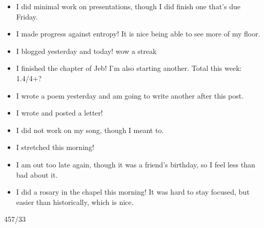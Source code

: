 \documentclass[12pt]{article}[titlepage]
\newcommand{\1}{\={a}}
\newcommand{\2}{\={e}}
\newcommand{\3}{\={\i}}
\newcommand{\4}{\=o}
\newcommand{\5}{\=u}
\newcommand{\6}{\={A}}
\renewcommand{\,}{\textsuperscript{,}}
\begin{document}
\begin{itemize}
\item I did minimal work on presentations, though I did finish one that's due Friday.
\item I made progress against entropy! It is nice being able to see more of my floor.
\item I blogged yesterday and today! wow a streak
\item I finished the chapter of Jeb! I'm also starting another. Total this week: 1.4/4+?
\item I wrote a poem yesterday and am going to write another after this post.
\item I wrote and posted a letter!
\item I did not work on my song, though I meant to.
\item I stretched this morning!
\item I am out too late again, though it was a friend's birthday, so I feel less than bad about it.
\item I did a rosary in the chapel this morning! It was hard to stay focused, but easier than historically, which is nice.
\end{itemize}
457/33
\end{document}
